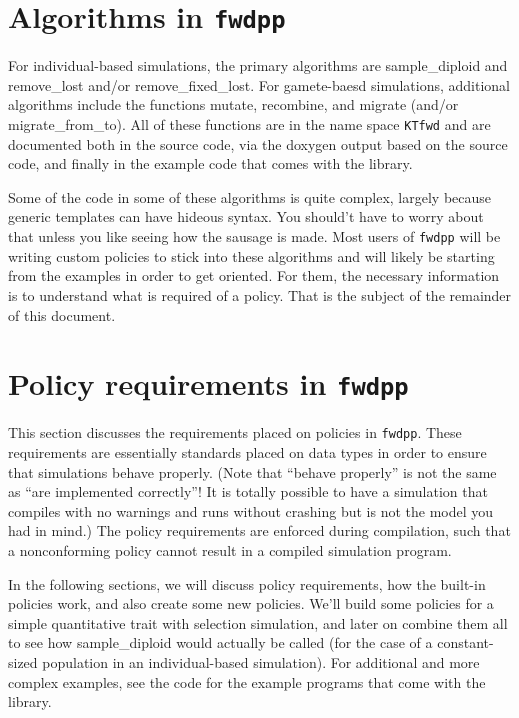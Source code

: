 \documentclass{article}
\begin{document}
\section{Algorithms in \texttt{fwdpp}}
For individual-based simulations, the primary algorithms are sample\_diploid and remove\_lost and/or remove\_fixed\_lost.  For gamete-baesd simulations, additional algorithms include the functions mutate, recombine, and migrate (and/or migrate\_from\_to).  All of these functions are in the name space \texttt{KTfwd} and are documented both in the source code, via the doxygen output based on the source code, and finally in the example code that comes with the library.

Some of the code in some of these algorithms is quite complex, largely because generic templates can have hideous syntax.  You should't have to worry about that unless you like seeing how the sausage is made.  Most users of \texttt{fwdpp} will be writing custom policies to stick into these algorithms and will likely be starting from the examples in order to get oriented.  For them, the necessary information is to understand what is required of a policy.  That is the subject of the remainder of this document.

\section{Policy requirements in \texttt{fwdpp}}
This section discusses the requirements placed on policies in \texttt{fwdpp}.  These requirements are essentially standards placed on data types in order to ensure that simulations behave properly. (Note that ``behave properly'' is not the same as ``are implemented correctly''!  It is totally possible to have a simulation that compiles with no warnings and runs without crashing but is not the model you had in mind.)  The policy requirements are enforced during compilation, such that a nonconforming policy cannot result in a compiled simulation program.

In the following sections, we will discuss policy requirements, how the built-in policies work, and also create some new policies.  We'll build some policies for a simple quantitative trait with selection simulation, and later on combine them all to see how sample\_diploid would actually be called (for the case of a constant-sized population in an individual-based simulation).  For additional and more complex examples, see the code for the example programs that come with the library.
\end{document}
